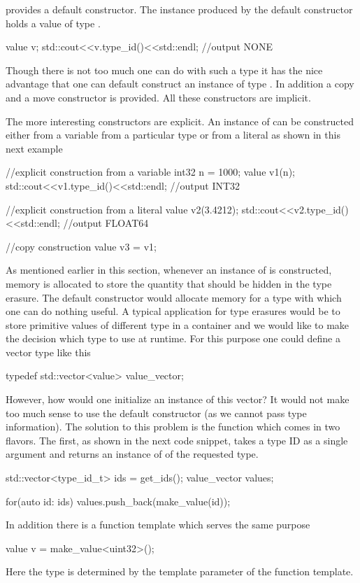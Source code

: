  provides a default constructor. The instance produced by the 
default constructor holds a value of type . \begin{cppcode}
value v;
std::cout<<v.type_id()<<std::endl; //output NONE
\end{cppcode}
Though there is not too much one can do with such a type it has the nice 
advantage that one can default construct an instance of type .
In addition a copy and a move constructor is provided. All these constructors
are implicit. 

The more interesting constructors are explicit. An instance of  
can be constructed either from a variable from a particular type or from a
literal as shown in this next example
\begin{cppcode}
//explicit construction from a variable
int32 n = 1000;
value v1(n);     
std::cout<<v1.type_id()<<std::endl; //output INT32

//explicit construction from a literal
value v2(3.4212); 
std::cout<<v2.type_id()<<std::endl; //output FLOAT64

//copy construction
value v3 = v1;
\end{cppcode}

As mentioned earlier in this section, whenever an instance of  
is constructed, memory is allocated to store the quantity that should be 
hidden in the type erasure. The default constructor would allocate memory for a 
 type with which one can do nothing useful. 
A typical application for type erasures would be to store primitive values 
of different type in a container and we would like to make the decision 
which type to use at runtime. 
For this purpose one could define a vector type like this
\begin{cppcode}
typedef std::vector<value> value_vector; 
\end{cppcode}
However, how would one initialize an instance of this vector? It would not make
too much sense to use the default constructor (as we cannot pass type
information). The solution to this problem is the  function
which comes in two flavors. The first, as shown in the next code snippet, takes
a type ID as a single argument and returns an instance of  of the 
requested type.
\begin{cppcode}
std::vector<type_id_t>  ids = get_ids();
value_vector values; 

for(auto id: ids)
    values.push_back(make_value(id));
\end{cppcode}
In addition there is a function template which serves the same purpose
\begin{cppcode}
value v = make_value<uint32>();
\end{cppcode}
Here the type is determined by the template parameter of the function template.

